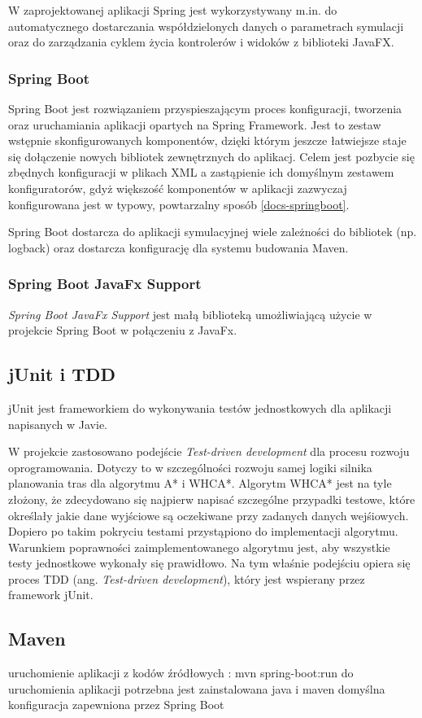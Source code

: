 W zaprojektowanej aplikacji Spring jest wykorzystywany m.in. do automatycznego dostarczania współdzielonych danych o parametrach symulacji oraz do zarządzania cyklem życia kontrolerów i widoków z biblioteki JavaFX.

\subsubsection{Spring Boot}
Spring Boot jest rozwiązaniem przyspieszającym proces konfiguracji, tworzenia oraz uruchamiania aplikacji opartych na Spring Framework.
Jest to zestaw wstępnie skonfigurowanych komponentów, dzięki którym jeszcze łatwiejsze staje się dołączenie nowych bibliotek zewnętrznych do aplikacj. Celem jest pozbycie się zbędnych konfiguracji w plikach XML a zastąpienie ich domyślnym zestawem konfiguratorów, gdyż większość komponentów w aplikacji zazwyczaj konfigurowana jest w typowy, powtarzalny sposób \ref{docs-springboot}.

Spring Boot dostarcza do aplikacji symulacyjnej wiele zależności do bibliotek (np. logback) oraz dostarcza konfigurację dla systemu budowania Maven.
\subsubsection{Spring Boot JavaFx Support}
{\it Spring Boot JavaFx Support} jest małą biblioteką umożliwiającą użycie w projekcie Spring Boot w połączeniu z JavaFx.

\subsection{jUnit i TDD}
jUnit jest frameworkiem do wykonywania testów jednostkowych dla aplikacji napisanych w Javie.

W projekcie zastosowano podejście {\it Test-driven development} dla procesu rozwoju oprogramowania. Dotyczy to w szczególności rozwoju samej logiki silnika planowania tras dla algorytmu A* i WHCA*. Algorytm WHCA* jest na tyle złożony, że zdecydowano się najpierw napisać szczególne przypadki testowe, które określały jakie dane wyjściowe są oczekiwane przy zadanych danych wejśiowych. Dopiero po takim pokryciu testami przystąpiono do implementacji algorytmu. Warunkiem poprawności zaimplementowanego algorytmu jest, aby wszystkie testy jednostkowe wykonały się prawidłowo. Na tym właśnie podejściu opiera się proces TDD (ang. {\it Test-driven development}), który jest wspierany przez framework jUnit.

\subsection{Maven}
uruchomienie aplikacji z kodów źródłowych : mvn spring-boot:run
do uruchomienia aplikacji potrzebna jest zainstalowana java i maven
domyślna konfiguracja zapewniona przez Spring Boot

